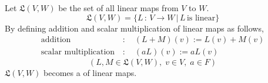 \documentclass[a4paper, 10pt]{article}
\begin{document}

\begin{definition}
    Let $\mathfrak{L}(V,W)$ be the set of all linear maps from $V$ to $W$.
    \[ \mathfrak{L}(V,W) = \{ L \,:\, V \rightarrow W \,|\, L \, \text{is linear} \} \]
    By defining addition and scalar multiplication of linear maps as follows,
    \begin{align*}
        \text{addition} \,&: \quad (L+M)(v) := L(v) + M(v) \\
        \text{scalar multiplication} \,&: \quad (aL)(v) := aL(v)
    \end{align*}
    \[ (L, M \in \mathfrak{L}(V, W),\; v \in V,\; a \in F) \]
    $\mathfrak{L}(V,W)$ becomes a  of linear maps.
\end{definition}

\seprule
\end{document}
